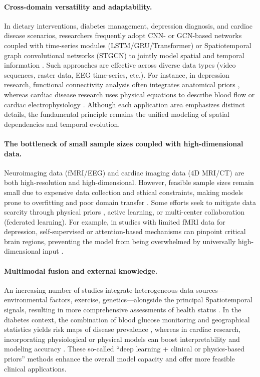\documentclass[acmsmall]{acmart}
\begin{document}
\paragraph{Cross-domain versatility and adaptability.}
In dietary interventions, diabetes management, depression diagnosis, and cardiac disease scenarios, researchers frequently adopt CNN- or GCN-based networks coupled with time-series modules (LSTM/GRU/Transformer) or Spatiotemporal graph convolutional networks (STGCN) to jointly model spatial and temporal information \cite{2,3,4,6}. Such approaches are effective across diverse data types (video sequences, raster data, EEG time-series, etc.). For instance, in depression research, functional connectivity analysis often integrates anatomical priors \cite{4}, whereas cardiac disease research uses physical equations to describe blood flow or cardiac electrophysiology \cite{5,7}. Although each application area emphasizes distinct details, the fundamental principle remains the unified modeling of spatial dependencies and temporal evolution.

\paragraph{The bottleneck of small sample sizes coupled with high-dimensional data.}
Neuroimaging data (fMRI/EEG) and cardiac imaging data (4D MRI/CT) are both high-resolution and high-dimensional. However, feasible sample sizes remain small due to expensive data collection and ethical constraints, making models prone to overfitting and poor domain transfer \cite{4,5,6}. Some efforts seek to mitigate data scarcity through physical priors \cite{7}, active learning, or multi-center collaboration (federated learning). For example, in studies with limited fMRI data for depression, self-supervised or attention-based mechanisms can pinpoint critical brain regions, preventing the model from being overwhelmed by universally high-dimensional input \cite{2,4}.

\paragraph{Multimodal fusion and external knowledge.}
An increasing number of studies integrate heterogeneous data sources—environmental factors, exercise, genetics—alongside the principal Spatiotemporal signals, resulting in more comprehensive assessments of health status \cite{2,3}. In the diabetes context, the combination of blood glucose monitoring and geographical statistics yields risk maps of disease prevalence \cite{3}, whereas in cardiac research, incorporating physiological or physical models can boost interpretability and modeling accuracy \cite{5,7}. These so-called ``deep learning + clinical or physics-based priors'' methods enhance the overall model capacity and offer more feasible clinical applications.
\end{document}

